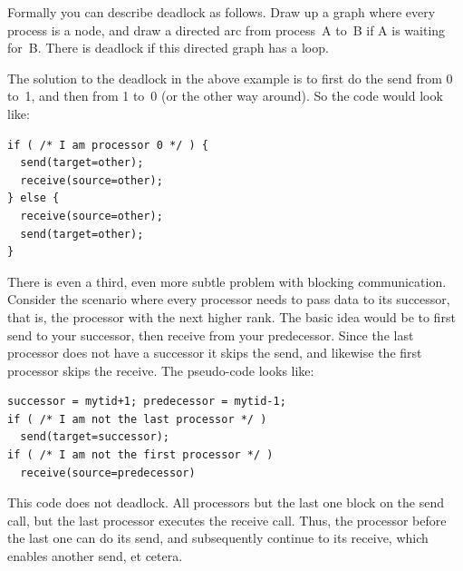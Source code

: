 Formally you can describe deadlock as follows. Draw up a graph where
every process is a node, and draw a directed arc from process~A to~B if
A is waiting for~B. There is deadlock if this directed graph has a
loop.

The solution to the deadlock in the above example
is to first do the send from 0 to~1, and then from 1 to~0 (or the other way around). So the code would look like:
\begin{verbatim}
if ( /* I am processor 0 */ ) {
  send(target=other);
  receive(source=other);
} else {
  receive(source=other);
  send(target=other);
}
\end{verbatim}

There is even a third, even more subtle problem with blocking
communication. Consider the scenario where every processor needs to
pass data to its successor, that is, the processor with the next
higher rank. The basic idea would be to first send to your successor,
then receive from your predecessor. Since the last processor does not
have a successor it skips the send, and likewise the first processor
skips the receive. The pseudo-code looks like:
\begin{verbatim}
successor = mytid+1; predecessor = mytid-1;
if ( /* I am not the last processor */ )
  send(target=successor);
if ( /* I am not the first processor */ )
  receive(source=predecessor)
\end{verbatim}
This code does not deadlock. All processors but the last one block on
the send call, but the last processor executes the receive call. Thus,
the processor before the last one can do its send, and subsequently
continue to its receive, which enables another send, et cetera.

